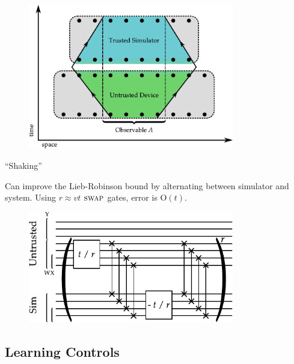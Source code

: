 \documentclass[xcolor=dvipsnames, compress]{beamer}
\newcommand{\OO}{\mathrm{O}}
\newcommand{\swapgt}{\textsc{swap}}
\begin{document}
\begin{frame}

  \begin{figure}
    \centering
    \includegraphics[width=0.8\textwidth]{figures/lightcones-vertical-v1}
  \end{figure}

\end{frame}

\begin{frame}{``Shaking''}

  Can improve the Lieb-Robinson bound by alternating between simulator
  and system. Using $r \approx vt$ $\swapgt$ gates, error is $\OO(t)$.

  \begin{figure}
    \centering
    \includegraphics[width=0.8\textwidth]{figures/shaking}
  \end{figure}

\end{frame}

\subsection[Control]{Learning Controls}
\end{document}
